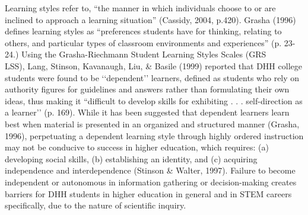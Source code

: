 \documentclass[11.5pt]{sig-alternate} %
\begin{document}
\begin{large}
Learning styles refer to, “the manner in which individuals choose to or are inclined to approach a learning situation” (Cassidy, 2004, p.420). Grasha (1996) defines learning styles as “preferences students have for thinking, relating to others, and particular types of classroom environments and experiences” (p. 23-24.)  Using the Grasha-Riechmann Student Learning Styles Scales (GRS\\LSS), Lang, Stinson, Kavanaugh, Liu, \& Basile (1999) reported that DHH college students were found to be ‘‘dependent’’ learners, defined as students who rely on authority figures for guidelines and answers rather than formulating their own ideas,  thus making it “difficult to develop skills for exhibiting . . . self-direction as a learner’’ (p. 169).  While it has been suggested that dependent learners learn best when material is presented in an organized and structured manner (Grasha, 1996), perpetuating a dependent learning style through highly ordered instruction may not be conducive to success in higher education, which requires:  (a) developing social skills, (b) establishing an identity, and (c) acquiring independence and interdependence (Stinson \& Walter, 1997).  Failure to become independent or autonomous in information gathering or decision-making creates barriers for DHH students in higher education in general and in STEM careers specifically, due to the nature of scientific inquiry. 


\end{large}
\end{document}
